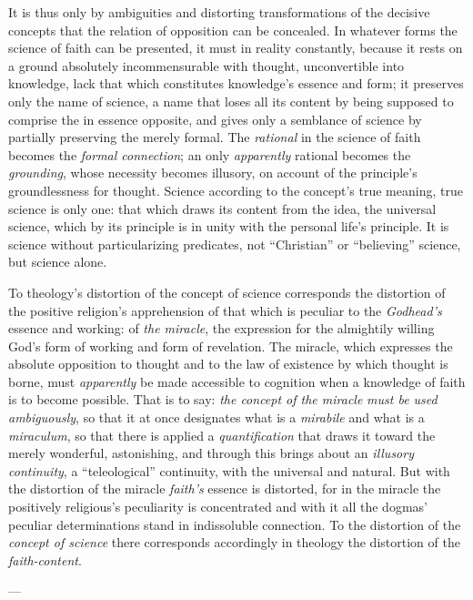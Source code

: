 \documentclass[12pt,a4paper]{book}
\begin{document}
It is thus only by ambiguities and distorting transformations of the decisive concepts that the
relation of opposition can be concealed. In whatever forms the science of faith can be presented,
it must in reality constantly, because it rests on a ground absolutely incommensurable with
thought, unconvertible into knowledge, lack that which constitutes knowledge's essence and form; it
preserves only the name of science, a name that loses all its content by being supposed to comprise
the in essence opposite, and gives only a semblance of science by partially preserving the merely
formal. The \emph{rational} in the science of faith becomes the \emph{formal connection}; an only \emph{apparently}
rational becomes the \emph{grounding}, whose necessity becomes illusory, on account of the principle's
groundlessness for thought. Science according to the concept's true meaning, true science is only
one: that which draws its content from the idea, the universal science, which by its principle is in
unity with the personal life's principle. It is science without particularizing predicates, not
``Christian'' or ``believing'' science, but science alone.

To theology's distortion of the concept of science corresponds the distortion of the positive
religion's apprehension of that which is peculiar to the \emph{Godhead's} essence and working: of \emph{the
miracle}, the expression for the almightily willing God's form of working and form of revelation.
The miracle, which expresses the absolute opposition to thought and to the law of existence by which
thought is borne, must \emph{apparently} be made accessible to cognition when a knowledge of faith is to
become possible. That is to say: \emph{the concept of the miracle} \emph{must be used ambiguously}, so that it at
once designates what is a \textit{mirabile} and what is a \textit{miraculum}, so that there is applied
a \emph{quantification} that draws it toward the merely wonderful, astonishing, and through this
brings about an \emph{illusory continuity}, a ``teleological'' continuity, with the universal and natural.
But with the distortion of the miracle \emph{faith's} essence is distorted, for in the miracle the
positively religious's peculiarity is concentrated and with it all the dogmas' peculiar
determinations stand in indissoluble connection. To the distortion of the \emph{concept of science} there
corresponds accordingly in theology the distortion of the \emph{faith-content}.

\begin{center}---\end{center}
\end{document}
